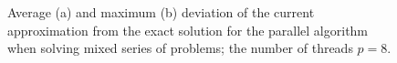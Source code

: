 \documentclass[smallcondensed]{svjour3}     %
\begin{document}
\begin{figure}
\begin{minipage}{0.5\linewidth}
\end{minipage}
\hfill
\begin{minipage}{0.5\linewidth}
\end{minipage}
\caption{Average (a) and maximum (b) deviation of the current approximation from the exact solution for the parallel algorithm when solving mixed series of problems; the number of threads $p = 8$.}
\label{fig_last6}
\end{figure}
\end{document}
